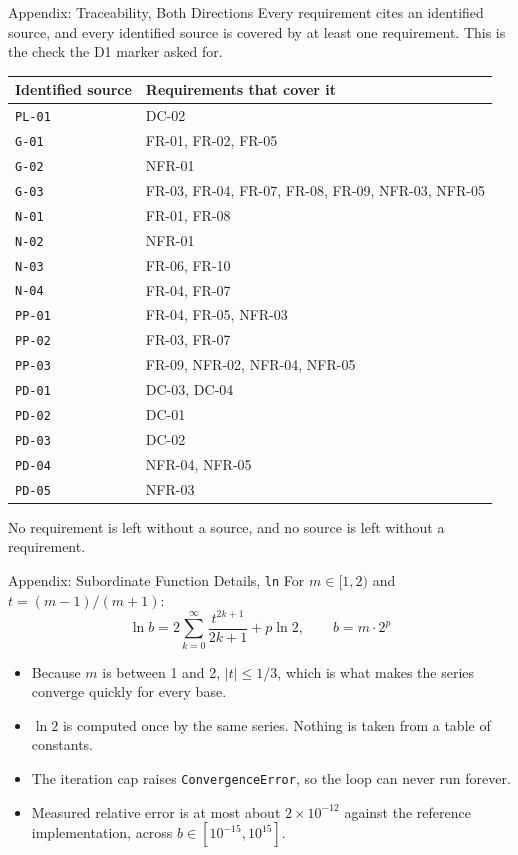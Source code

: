 \documentclass[11pt]{beamer}
\begin{document}
\begin{frame}{Appendix: Traceability, Both Directions}
  \scriptsize
  Every requirement cites an identified source, and every identified source is
  covered by at least one requirement. This is the check the D1 marker asked
  for.
  \begin{center}
  \begin{tabular}{ll}
    \toprule
    Identified source & Requirements that cover it \\
    \midrule
    \texttt{PL-01} & DC-02 \\
    \texttt{G-01} & FR-01, FR-02, FR-05 \\
    \texttt{G-02} & NFR-01 \\
    \texttt{G-03} & FR-03, FR-04, FR-07, FR-08, FR-09, NFR-03, NFR-05 \\
    \texttt{N-01} & FR-01, FR-08 \\
    \texttt{N-02} & NFR-01 \\
    \texttt{N-03} & FR-06, FR-10 \\
    \texttt{N-04} & FR-04, FR-07 \\
    \texttt{PP-01} & FR-04, FR-05, NFR-03 \\
    \texttt{PP-02} & FR-03, FR-07 \\
    \texttt{PP-03} & FR-09, NFR-02, NFR-04, NFR-05 \\
    \texttt{PD-01} & DC-03, DC-04 \\
    \texttt{PD-02} & DC-01 \\
    \texttt{PD-03} & DC-02 \\
    \texttt{PD-04} & NFR-04, NFR-05 \\
    \texttt{PD-05} & NFR-03 \\
    \bottomrule
  \end{tabular}
  \end{center}
  No requirement is left without a source, and no source is left without a
  requirement.
\end{frame}

\begin{frame}{Appendix: Subordinate Function Details, \texttt{ln}}
  For $m \in [1,2)$ and $t = (m-1)/(m+1)$:
  \[ \ln b = 2 \sum_{k=0}^{\infty} \frac{t^{2k+1}}{2k+1} + p \ln 2,
     \qquad b = m \cdot 2^{p} \]
  \begin{itemize}
    \item Because $m$ is between 1 and 2, $|t| \le 1/3$, which is what makes
          the series converge quickly for every base.
    \item $\ln 2$ is computed once by the same series. Nothing is taken from a
          table of constants.
    \item The iteration cap raises \texttt{ConvergenceError}, so the loop can
          never run forever.
    \item Measured relative error is at most about $2 \times 10^{-12}$ against
          the reference implementation, across $b \in [10^{-15}, 10^{15}]$.
  \end{itemize}
\end{frame}
\end{document}
